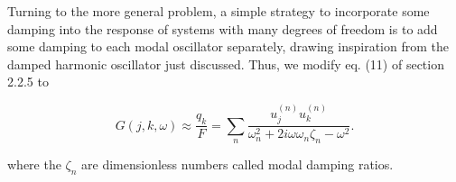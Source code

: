   Turning to the more general problem, a simple strategy to incorporate some 
  damping into the response of systems with many degrees of freedom is to add 
  some damping to each modal oscillator separately, drawing inspiration from 
  the damped harmonic oscillator just discussed. Thus, we modify eq. (11) of 
  section 2.2.5 to 

  $$G(j,k,\omega) \approx \dfrac{q_k}{F}=\sum_n 
  \dfrac{u_j^{(n)}u_k^{(n)}}{\omega_n^2+2i\omega \omega_n \zeta_n-\omega^2}. 
  \tag{12}$$ 

  where the $\zeta_n$ are dimensionless numbers called modal damping ratios. 